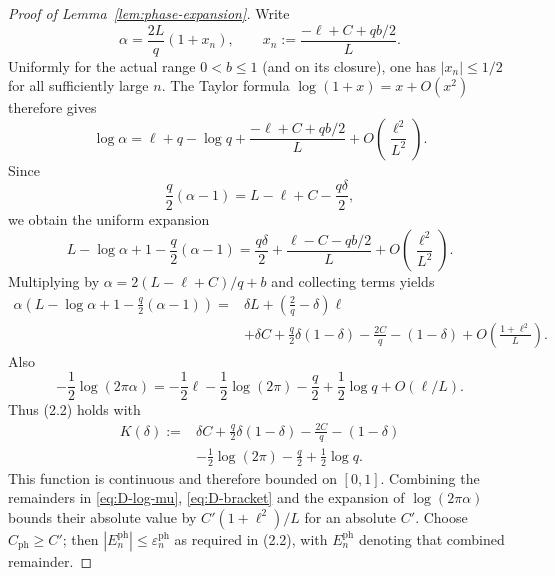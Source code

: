 \documentclass[a4paper,10pt,reqno]{amsart}
\numberwithin{equation}{section}
\theoremstyle{plain}
\theoremstyle{remark}
\begin{document}
\begin{proof}[Proof of Lemma~\ref{lem:phase-expansion}]
Write
\[
  \alpha=\frac{2L}{q}(1+x_n),
  \qquad
  x_n:=\frac{-\ell+C+qb/2}{L}.
\]
Uniformly for the actual range $0<b\le1$ (and on its closure), one has
$|x_n|\le1/2$ for all sufficiently large $n$. The Taylor formula
$\log(1+x)=x+O(x^2)$ therefore gives
\[
  \log\alpha
  =\ell+q-\log q
   +\frac{-\ell+C+qb/2}{L}
   +O\!\left(\frac{\ell^2}{L^2}\right).
\]
Since
\[
  \frac q2(\alpha-1)=L-\ell+C-\frac{q\delta}{2},
\]
we obtain the uniform expansion
\begin{equation}
  L-\log\alpha+1-\frac q2(\alpha-1)
  =
  \frac{q\delta}{2}
  +\frac{\ell-C-qb/2}{L}
  +O\!\left(\frac{\ell^2}{L^2}\right).
  \label{eq:D-bracket}
\end{equation}
Multiplying by
$\alpha=2(L-\ell+C)/q+b$ and collecting terms yields
\[
\begin{split}
  \alpha\left(
    L-\log\alpha+1-\frac q2(\alpha-1)
  \right)
  ={}&
  \delta L+\left(\frac2q-\delta\right)\ell\\
  &+\delta C+\frac q2\delta(1-\delta)
    -\frac{2C}{q}-(1-\delta)
    +O\!\left(\frac{1+\ell^2}{L}\right).
\end{split}
\]
Also
\[
  -\frac12\log(2\pi\alpha)
  =-\frac12\ell-\frac12\log(2\pi)-\frac q2
    +\frac12\log q+O(\ell/L).
\]
Thus (2.2) holds with
\begin{equation}
\begin{split}
  K(\delta):={}&
  \delta C+\frac q2\delta(1-\delta)-\frac{2C}{q}-(1-\delta)\\
  &-\frac12\log(2\pi)-\frac q2+\frac12\log q.
\end{split}
  \label{eq:D-K}
\end{equation}
This function is continuous and therefore bounded on $[0,1]$. Combining
the remainders in \eqref{eq:D-log-mu}, \eqref{eq:D-bracket} and the
expansion of $\log(2\pi\alpha)$ bounds their absolute value by
$C'(1+\ell^2)/L$ for an absolute $C'$. Choose
$C_{\mathrm{ph}}\ge C'$; then
$|E_n^{\mathrm{ph}}|\le\varepsilon_n^{\mathrm{ph}}$ as required in (2.2),
with $E_n^{\mathrm{ph}}$ denoting that combined remainder.


\end{proof}
\end{document}
